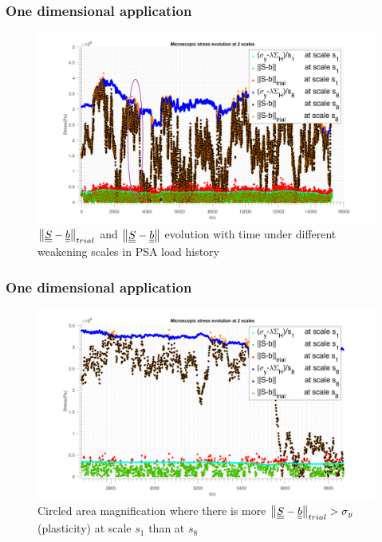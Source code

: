 \documentclass[xcolor=table]{Bredelebeamer}
\begin{document}
\begin{frame}
	\frametitle{One dimensional application}
\begin{figure}[!h]
	\centering
	\includegraphics[width=\textwidth]{figures//trialreal1d1.png} 
	\caption{$\left\|  \uline{\uline{S}}-\uline{\uline{b}}\right\| _{trial}$ and $\left\| \uline{\uline{S}}-\uline{\uline{b}}\right\|$ evolution with time under different weakening scales in PSA load history}
	\label{trialreal}
\end{figure}
\end{frame}	

\begin{frame}
	\frametitle{One dimensional application}
	\begin{figure}[!h]
		\centering
		\includegraphics[width=\textwidth]{figures//trialreal1d2.png} 
		\caption{Circled area magnification where there is more $\left\| \uline{\uline{S}}-\uline{\uline{b}}\right\|_{trial}>\sigma_y$(plasticity) at scale $s_1$ than at $s_8$}
		\label{trialreal1d3}
	\end{figure}
\end{frame}	
\end{document}
